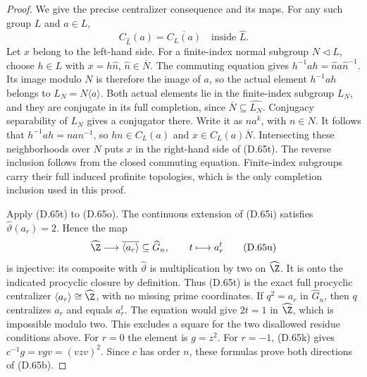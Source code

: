 \begin{proof}
We give the precise centralizer consequence and
its maps. For any such group $L$ and $a\in L$,
\[
           C_{\widehat L}(a)=\overline{C_L(a)}
                         \quad\text{inside }\widehat L.       \tag{D.65t}
\]
Let $x$ belong to the left-hand side.
For a finite-index normal subgroup $N\lhd L$,
choose $h\in L$ with $x=h\widehat n$,
$\widehat n\in\overline N$.
The commuting equation gives
$h^{-1}ah=\widehat n a\widehat n^{-1}$.
Its image modulo $N$ is therefore the image of $a$,
so the actual element $h^{-1}ah$ belongs to
$L_N=N\langle a\rangle$.
Both actual elements lie in the finite-index
subgroup $L_N$, and they are
conjugate in its full completion, since
$\overline N\subseteq\widehat{L_N}$.
Conjugacy separability of $L_N$ gives a conjugator
there. Write it as $n a^k$, with $n\in N$.
It follows that
$h^{-1}ah=n a n^{-1}$, so $hn\in C_L(a)$ and
$x\in C_L(a)\overline N$.
Intersecting these neighborhoods over $N$ puts
$x$ in the right-hand side of (D.65t).
The reverse inclusion follows from the closed
commuting equation.
Finite-index subgroups carry their full induced
profinite topologies, which is the only completion
inclusion used in this proof.

Apply (D.65t) to (D.65o).
The continuous extension of (D.65i) satisfies
$\widehat\vartheta(a_r)=2$.
Hence the map
\[
       \widehat\Z\longrightarrow
             \overline{\langle a_r\rangle}
                  \subseteq\widehat G_n,\qquad t\longmapsto a_r^t
                                                               \tag{D.65u}
\]
is injective: its composite with
$\widehat\vartheta$ is multiplication by two
on $\widehat\Z$.
It is onto the indicated procyclic closure by
definition.
Thus (D.65t) is the exact full procyclic
centralizer $\langle a_r\rangle\cong\widehat\Z$,
with no missing prime coordinates.
If $q^2=a_r$ in $\widehat G_n$, then $q$
centralizes $a_r$ and equals $a_r^t$.
The equation would give $2t=1$ in $\widehat\Z$,
which is impossible modulo two.
This excludes a square for the two disallowed
residue conditions above.
For $r=0$ the element is $g=z^2$.
For $r=-1$, (D.65k) gives
$c^{-1}g=vgv=(vzv)^2$.
Since $c$ has order $n$, these formulas prove
both directions of (D.65b).


\end{proof}
